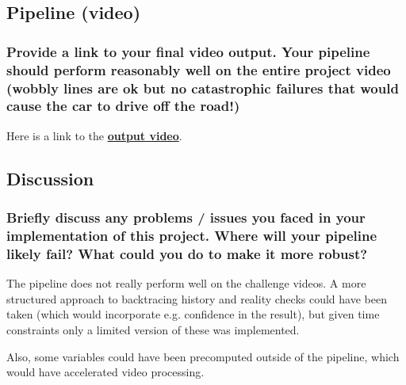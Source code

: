 \documentclass[a4paper,10pt]{article}
\begin{document}
\subsection{Pipeline (video)}

\subsubsection{Provide a link to your final video output. Your pipeline should perform reasonably well on the entire project video 
(wobbly lines are ok but no catastrophic failures that would cause the car to drive off the road!)}

Here is a link to the \href{https://github.com/czechows/udacity----advanced-lane-lines/blob/master/output.mp4}{\textbf{output video}}.

\subsection{Discussion}

\subsubsection{Briefly discuss any problems / issues you faced in your implementation of this project. Where will your pipeline likely fail? What could you do to make it more robust?}

The pipeline does not really perform well on the challenge videos.
A more structured approach to backtracing history and reality checks could have been taken (which would incorporate e.g. confidence in the result),
but given time constraints only a limited version of these was implemented.

Also, some variables could have been precomputed outside of the pipeline, which would have accelerated video processing.
\end{document}
